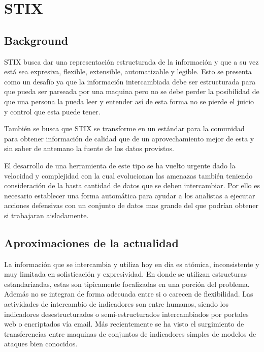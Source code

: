 
\chapter{STIX} 
\label{Chapter3}


\section{Background}

STIX busca dar una representación estructurada de la información y que a su vez 
está sea expresiva, flexible, extensible, automatizable y legible. Esto se 
presenta como un desafío ya que la información intercambiada debe ser 
estructurada para que pueda ser parseada por una maquina pero no se debe perder 
la posibilidad de que una persona la pueda leer y entender así de esta forma no se 
pierde el juicio y control que esta puede tener.

También se busca que STIX se transforme en un estándar para la comunidad para 
obtener información de calidad que de un aprovechamiento mejor de esta y sin 
saber de antemano la fuente de los datos provistos.

El desarrollo de una herramienta de este tipo se ha vuelto urgente dado la 
velocidad y complejidad con la cual evolucionan las amenazas también teniendo 
consideración de la basta cantidad de datos que se deben intercambiar. Por ello 
es necesario establecer una forma automática para ayudar a los analistas a 
ejecutar acciones defensivas con un conjunto de datos mas grande del que podrían 
obtener si trabajaran aisladamente.

\section{Aproximaciones de la actualidad}
La información que se intercambia y utiliza hoy en día es atómica, 
inconsistente y muy limitada en sofisticación y expresividad. En donde se 
utilizan estructuras estandarizadas, estas son tipicamente focalizadas en una 
porción del problema. Además no se integran de forma adecuada entre si o carecen 
de flexibilidad. Las actividades de intercambio de indicadores son entre 
humanos, siendo los indicadores desestructurados o semi-estructurados 
intercambiados por portales web o encriptados vía email. Más recientemente se 
ha visto el surgimiento de transferencias entre maquinas de conjuntos de 
indicadores simples de modelos de ataques bien conocidos.

